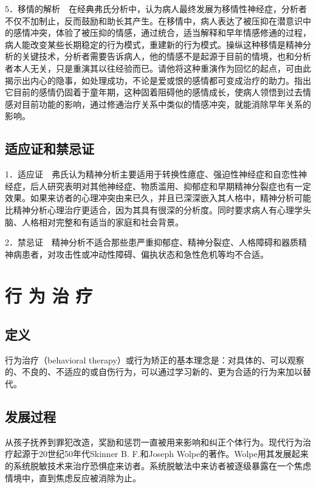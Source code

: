 5．移情的解析　在经典弗氏分析中，认为病人最终发展为移情性神经症，分析者不仅不加制止，反而鼓励和助长其产生。在移情中，病人表达了被压抑在潜意识中的感情冲突，体验了被压抑的情感，通过统合，适当解释和早年情感修通的过程，病人能改变某些长期稳定的行为模式，重建新的行为模式。操纵这种移情是精神分析的关键技术，分析者需要告诉病人，他的情感不是起源于目前的情境，也和分析者本人无关，只是重演其以往经验而已。请他将这种重演作为回忆的起点，可由此揭示出内心的隐事，如处理成功，不论是爱或恨的感情都可变成治疗的助力。指出它目前的感情仍固着于童年期，这种固着阻碍他的感情成长，使病人领悟到过去情感对目前功能的影响，通过修通治疗关系中类似的情感冲突，就能消除早年关系的影响。

\subsection{适应证和禁忌证}

1．适应证　弗氏认为精神分析主要适用于转换性癔症、强迫性神经症和自恋性神经症，后人研究表明对其他神经症、物质滥用、抑郁症和早期精神分裂症也有一定效果。如果来访者的心理冲突由来已久，并且已深深嵌入其人格中，精神分析可能比精神分析心理治疗更适合，因为其具有很深的分析度。同时要求病人有心理学头脑、人格相对完整和有适当的家庭和社会背景。

2．禁忌证　精神分析不适合那些患严重抑郁症、精神分裂症、人格障碍和器质精神病患者，对攻击性或冲动性障碍、偏执状态和急性危机等均不合适。


\section{行 为 治 疗}

\subsection{定义}

行为治疗（behavioral
therapy）或行为矫正的基本理念是：对具体的、可以观察的、不良的、不适应的或自伤行为，可以通过学习新的、更为合适的行为来加以替代。

\subsection{发展过程}

从孩子抚养到罪犯改造，奖励和惩罚一直被用来影响和纠正个体行为。现代行为治疗起源于20世纪50年代Skinner
B. F.和Joseph
Wolpe的著作。Wolpe用其发展起来的系统脱敏技术来治疗恐惧症来访者。系统脱敏法中来访者被逐级暴露在一个焦虑情境中，直到焦虑反应被消除为止。

